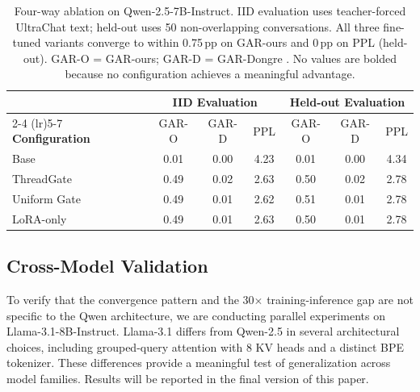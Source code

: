 \begin{table}[t]
\centering
\small
\caption{Four-way ablation on Qwen-2.5-7B-Instruct. IID evaluation uses teacher-forced UltraChat text; held-out uses 50 non-overlapping conversations. All three fine-tuned variants converge to within 0.75\,pp on GAR-ours and 0\,pp on PPL (held-out). GAR-O = GAR-ours; GAR-D = GAR-Dongre \citep{dongre2026attention}. No values are bolded because no configuration achieves a meaningful advantage.}
\label{tab:four-way}
\begin{tabular}{l ccc ccc}
\toprule
& \multicolumn{3}{c}{\textbf{IID Evaluation}} & \multicolumn{3}{c}{\textbf{Held-out Evaluation}} \\
\cmidrule(lr){2-4} \cmidrule(lr){5-7}
\textbf{Configuration} & GAR-O & GAR-D & PPL & GAR-O & GAR-D & PPL \\
\midrule
Base          & 0.01 & 0.00 & 4.23 & 0.01 & 0.00 & 4.34 \\
ThreadGate    & 0.49 & 0.02 & 2.63 & 0.50 & 0.02 & 2.78 \\
Uniform Gate  & 0.49 & 0.01 & 2.62 & 0.51 & 0.01 & 2.78 \\
LoRA-only     & 0.49 & 0.01 & 2.63 & 0.50 & 0.01 & 2.78 \\
\bottomrule
\end{tabular}
\end{table}

\subsection{Cross-Model Validation}
\label{sec:cross-model}

To verify that the convergence pattern and the 30$\times$ training-inference gap are not specific to the Qwen architecture, we are conducting parallel experiments on Llama-3.1-8B-Instruct. Llama-3.1 differs from Qwen-2.5 in several architectural choices, including grouped-query attention with 8 KV heads and a distinct BPE tokenizer. These differences provide a meaningful test of generalization across model families. Results will be reported in the final version of this paper.